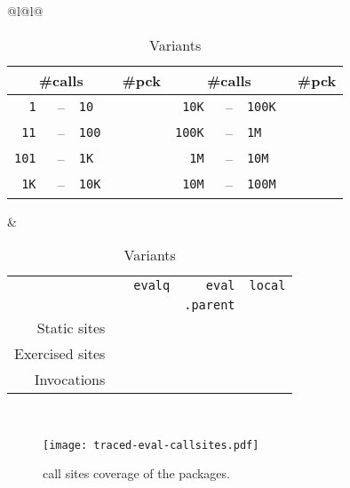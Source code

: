 \documentclass[acmsmall, screen]{acmart}
\renewcommand{\k}[1]{\lstinline |#1|\xspace}
\begin{document}
\begin{table}[!h]
\centering
  \small
  \begin{tabular}{@{}l@{\hspace{1.5cm}}l@{}}
\begin{minipage} {5cm}\small
  \begin{tabular}{r@{\,}r@{\,}l@{}r|r@{\,}r@{\,}l@{}r@{}} \toprule
    \multicolumn{3}{c}{\bf \small\#calls} &\bf \small \#pck
&     \multicolumn{3}{c}{\bf \small\#calls} &\bf \small\#pck \\\midrule
\tt 1 &--& \tt 10      & \packageBina  & \tt 10K &--&\tt 100K  & \packageBine\\
\tt 11 &--& \tt 100    & \packageBinb  & \tt 100K &--&\tt 1M  & \packageBinf\\
\tt 101 &--& \tt 1K    & \packageBinc  & \tt 1M &--&\tt 10M   & \packageBing\\
\tt 1K &--& \tt 10K    & \packageBind  & \tt 10M &--& \tt 100M & \packageBinh\\\bottomrule
\end{tabular}
\caption{Call frequency}\label{tab:freq}
\end{minipage}
&
\begin{minipage}{7cm}\small
\begin{tabular}{@{}r|r@{~}r@{}r@{~}r@{}}\toprule
  &\eval & \k{evalq} & \k{eval} & \k{local}\\[-1.5mm]
           & & & \k{.parent} &\\\midrule
\small Static sites &\packageStaticeval&\packageStaticevalq&\packageStaticevalparent&\packageStaticlocal \\
\small Exercised sites&\packageTriggeredeval&\packageTriggeredevalq&\packageTriggeredevalparent&\packageTriggeredlocal\\
\small Invocations&\packageEvalsRnd&\packageEvalqsRnd&\packageEparentsRnd&\packageLocalsRnd\\\bottomrule
\end{tabular}~\\[2mm]\caption{Variants}\label{tab:variantseval}
\end{minipage}\end{tabular}

\end{table}
\begin{figure}[H]
  \texttt{[image: traced-eval-callsites.pdf]} \centering
  \caption{\eval call sites coverage of the \PkgPackages packages.}%
  \label{fig:traced-eval-callsites}
\end{figure}
\end{document}
